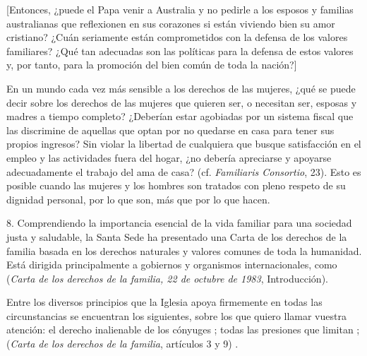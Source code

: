 \begin{body}
\begin{body}
		{[}Entonces, ¿puede el Papa venir a Australia y no pedirle a los esposos y familias australianas que reflexionen en sus corazones si están viviendo bien su amor cristiano? ¿Cuán seriamente están comprometidos con la defensa de los valores familiares? ¿Qué tan adecuadas son las políticas para la defensa de estos valores y, por tanto, para la promoción del bien común de toda la nación?{]}

		En un mundo cada vez más sensible a los derechos de las mujeres, ¿qué se puede decir sobre los derechos de las mujeres que quieren ser, o necesitan ser, esposas y madres a tiempo completo? ¿Deberían estar agobiadas por un sistema fiscal que las discrimine de aquellas que optan por no quedarse en casa para tener sus propios ingresos? Sin violar la libertad de cualquiera que busque satisfacción en el empleo y las actividades fuera del hogar, ¿no debería apreciarse y apoyarse adecuadamente el trabajo del ama de casa? (cf. \emph{Familiaris Consortio}, 23). Esto es posible cuando las mujeres y los hombres son tratados con pleno respeto de su dignidad personal, por lo que son, más que por lo que hacen.

		8. Comprendiendo la importancia esencial de la vida familiar para una sociedad justa y saludable, la Santa Sede ha presentado una Carta de los derechos de la familia basada en los derechos naturales y valores comunes de toda la humanidad. Está dirigida principalmente a gobiernos y organismos internacionales, como  (\emph{Carta de los derechos de la familia, 22 de octubre de 1983}, Introducción).

		Entre los diversos principios que la Iglesia apoya firmemente en todas las circunstancias se encuentran los siguientes, sobre los que quiero llamar vuestra atención: el derecho inalienable de los cónyuges ; todas las presiones que limitan ;  (\emph{Carta de los derechos de la familia}, artículos 3 y 9) .


\end{body}
\end{body}
